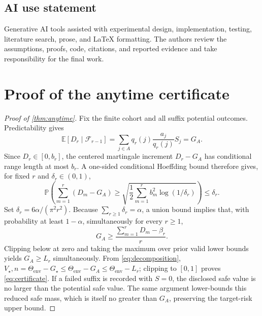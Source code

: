 \documentclass{article}
\newcommand{\E}{\mathbb{E}}
\newcommand{\Prob}{\mathbb{P}}
\newcommand{\Vstar}{V_\star}
\newcommand{\Thetaenv}{\Theta_{\mathrm{env}}}
\newcommand{\F}{\mathcal{F}}
\begin{document}
\subsection*{AI use statement}

Generative AI tools assisted with experimental design, implementation, testing, literature search,
prose, and LaTeX formatting. The authors review the assumptions, proofs, code, citations, and
reported evidence and take responsibility for the final work.



\appendix

\section{Proof of the anytime certificate}
\label{app:proof}

\begin{proof}[Proof of \cref{thm:anytime}]
Fix the finite cohort and all suffix potential outcomes. Predictability gives
\begin{equation}
  \E[D_r\mid\F_{r-1}]
  =\sum_{j\in A}q_r(j)\frac{a_j}{q_r(j)}S_j
  =G_A.
\end{equation}
Since $D_r\in[0,b_r]$, the centered martingale increment $D_r-G_A$ has conditional
range length at most $b_r$. A one-sided conditional Hoeffding bound therefore gives, for fixed
$r$ and $\delta_r\in(0,1)$,
\begin{equation}
  \Prob\!\left(
  \sum_{m=1}^{r}(D_m-G_A)
  \geq \sqrt{\frac12\sum_{m=1}^{r}b_m^2\log(1/\delta_r)}
  \right)\leq\delta_r.
\end{equation}
Set $\delta_r=6\alpha/(\pi^2r^2)$. Because
$\sum_{r\geq1}\delta_r=\alpha$, a union bound implies that, with probability at least
$1-\alpha$, simultaneously for every $r\geq1$,
\begin{equation}
  G_A\geq
  \frac{\sum_{m=1}^{r}D_m-\beta_r}{r}.
\end{equation}
Clipping below at zero and taking the maximum over prior valid lower bounds yields
$G_A\geq L_r$ simultaneously. From \cref{eq:decomposition},
$\Vstar,n=\Thetaenv-G_\star\leq\Thetaenv-G_A\leq\Thetaenv-L_r$; clipping to $[0,1]$
proves \cref{eq:certificate}. If a failed suffix is recorded with $S=0$, the disclosed safe value
is no larger than the potential safe value. The same argument lower-bounds this reduced safe mass,
which is itself no greater than $G_A$, preserving the target-risk upper bound.
\end{proof}
\end{document}
